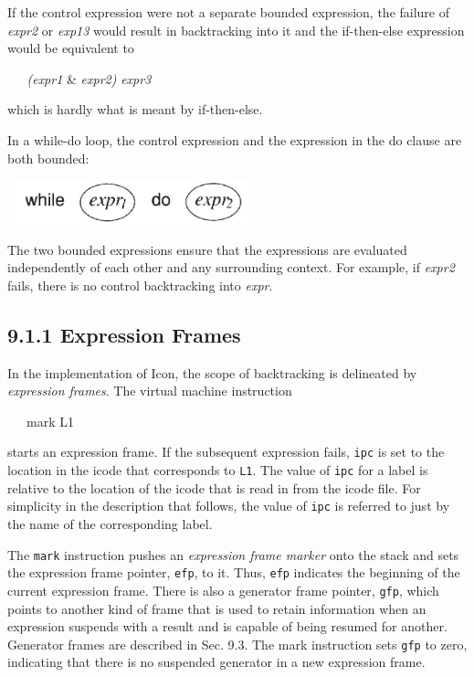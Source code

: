If the control expression were not a separate bounded expression, the
failure of \textit{expr2} or \textit{exp13} would result in
backtracking into it and the if-then-else expression would be
equivalent to

{\ttfamily\mdseries
\textit{\ \ \ (expr1 }\& \textit{expr2) }{\textbar} \textit{expr3}}

\noindent which is hardly what is meant by if-then-else.

In a while-do loop, the control expression and the expression in the
do clause are both bounded:

\begin{center}
\includegraphics[width=2.8339in,height=0.4992in]{ib-img/ib-img061.jpg}
\end{center}

The two bounded expressions ensure that the expressions are evaluated
independently of each other and any surrounding context. For example,
if \textit{expr2} fails, there is no control backtracking into
\textit{expr}.

\subsection[9.1.1 Expression Frames]{9.1.1 Expression Frames}

In the implementation of Icon, the scope of backtracking is delineated
by \textit{expression frames}. The virtual machine instruction

{\ttfamily\mdseries
\ \ \ mark L1}

\noindent starts an expression frame. If the subsequent expression
fails, \texttt{ipc} is set to the location in the icode that
corresponds to \texttt{L1}. The value of \texttt{ipc} for a label is
relative to the location of the icode that is read in from the icode
file. For simplicity in the description that follows, the value of
\texttt{ipc} is referred to just by the name of the corresponding
label.

The \texttt{mark} instruction pushes an \textit{expression frame
marker }onto the stack and sets the expression frame pointer,
\texttt{efp}, to it. Thus, \texttt{efp} indicates the beginning of the
current expression frame. There is also a generator frame pointer,
\texttt{gfp}, which points to another kind of frame that is used to
retain information when an expression suspends with a result and is
capable of being resumed for another. Generator frames are described
in Sec. 9.3. The mark instruction sets \texttt{gfp} to zero,
indicating that there is no suspended generator in a new expression
frame.


